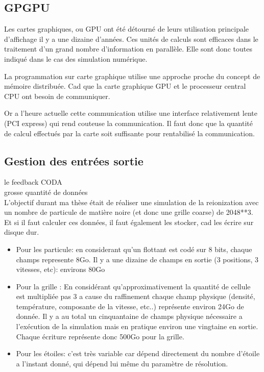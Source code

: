

\subsection{GPGPU}

Les cartes graphiques, ou GPU ont été détourné de leurs utilisation principale d'affichage il y a une dizaine d'années.
Ces unités de calculs sont  efficaces dans le traitement d'un grand nombre d'information en parallèle.
Elle sont donc toutes indiqué dans le cas des simulation numérique.

La programmation sur carte graphique utilise une approche proche du concept de mémoire distribuée.
Cad que la carte graphique GPU et le processeur central CPU ont besoin de communiquer.

Or a l'heure actuelle cette communication utilise une interface relativement lente (PCI express) qui rend couteuse la communication. 
Il faut donc que la quantité de calcul effectués par la carte soit suffisante pour rentabilisé la communication.





\subsection{Gestion des entrées sortie}

le feedback CODA\\
grosse quantité de données\\

L'objectif durant ma thèse était de réaliser une simulation de la reionization avec un nombre de particule de matière noire (et donc une grille coarse) de 2048**3.
Et si il faut calculer ces données, il faut également les stocker, cad les écrire sur disque dur.

\begin{itemize}

\item Pour les particule:
en considerant qu'un flottant est codé sur 8 bits, chaque champs represente 8Go.
Il y a une dizaine de champs en sortie (3 positions, 3 vitesses, etc): environs 80Go

\item Pour la grille :
En considérant qu'approximativement la quantité de cellule est multipliée pas 3 a cause du raffinement  chaque champ physique (densité, température, composante de la vitesse, etc..) représente environ 24Go de donnée.
Il y a au total un cinquantaine de champs physique nécessaire a l'exécution de la simulation mais en pratique environ une vingtaine en sortie.
Chaque écriture représente donc 500Go pour la grille.

\item Pour les étoiles:
c'est très variable car dépend directement du nombre d'étoile a l'instant donné, qui dépend lui même du paramètre de résolution.

\end{itemize}

